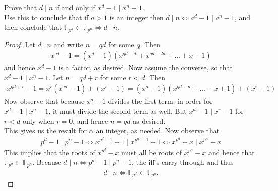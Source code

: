 \documentclass[num=9,duedate=04-07-21,course=Algebra\ II,proflastname=Walton]{hwtemplate}
\begin{document}
\problem[3]
\begin{claim}
	Prove that \(d\mid n\) if and only if \(x^{d}-1 \mid x^{n}-1\).\\ %

	Use this to conclude that if \(a>1\) is an integer then \(d\mid n \iff a^{d}-1 \mid a^{n}-1\), and then conclude that \(\mathbb{F}_{p^{d}}\subset \mathbb{F}_{p^{n}} \iff d\mid n\).
\end{claim}
\begin{proof}
	Let \(d\mid n\) and write \(n = qd\) for some \(q\). Then
	\begin{align*}
		x^{qd}-1 = (x^{d}-1) (x^{qd-d} + x^{qd-2d} + \ldots + x + 1)
	\end{align*}
	and hence \(x^{d}-1\) is a factor, as desired. Now assume the converse, so that \(x^{d}-1 \mid x^{n}-1\). Let \(n = qd+r\) for some \(r<d\). Then
	\begin{align*}
		x^{qd+r}-1 = x^{r}(x^{qd}-1)+ (x^{r}-1) = (x^{d}-1)(x^{qd-d} + \ldots + x + 1) + (x^{r}-1)
	\end{align*}
	Now observe that because \(x^{d}-1\) divides the first term, in order for \(x^{d}-1 \mid x^{n}-1\), it must divide the second term as well. But \(x^{d}-1 \mid x^{r}-1\) for \(r<d\) only when \(r=0\), and hence \(n=qd\) as desired.\\

	This gives us the result for \(\alpha \) an integer, as needed. Now observe that
	\begin{align*}
		p^{d}-1 \mid p^{n}-1 \iff x^{p^{d}-1}-1 \mid x^{p^{n}-1}-1 \iff x^{p^{d}}-x \mid x^{p^{n}}-x
	\end{align*}
	This implies that the roots of \(x^{p^{d}}-x\) must all be roots of \(x^{p^{n}}-x\) and hence that \(\mathbb{F}_{p^{d}}\subset \mathbb{F}_{p^{n}}\). Because \(d\mid n \iff p^{d}-1 \mid p^{n}-1\), the iff's carry through and thus
		\begin{align*}
			d\mid n \iff \mathbb{F}_{p^{d}}\subset \mathbb{F}_{p^{n}}.
		\end{align*}
\end{proof}
\separator
\end{document}
